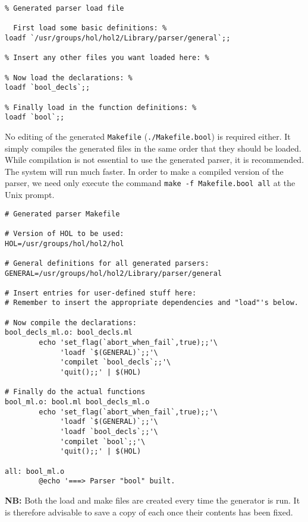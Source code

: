 \small
\begin{center}
\begin{boxed}
\begin{verbatim}
% Generated parser load file 

  First load some basic definitions: %
loadf `/usr/groups/hol/hol2/Library/parser/general`;;

% Insert any other files you want loaded here: %

% Now load the declarations: %
loadf `bool_decls`;;

% Finally load in the function definitions: %
loadf `bool`;; 
\end{verbatim}
\end{boxed}
\end{center}
\normalsize

No editing of the generated {\tt Makefile} (\verb"./Makefile.bool") is 
required either.  It simply compiles the generated files in the same order
that they should be loaded.  While compilation is not essential to use the
generated parser, it is recommended.  The system will run much faster.
In order to make a compiled version of the parser, we need only execute the 
command \verb"make -f Makefile.bool all" at the Unix prompt.
\small
\begin{center}
\begin{boxed}
\begin{verbatim}
# Generated parser Makefile

# Version of HOL to be used:
HOL=/usr/groups/hol/hol2/hol

# General definitions for all generated parsers:
GENERAL=/usr/groups/hol/hol2/Library/parser/general

# Insert entries for user-defined stuff here:
# Remember to insert the appropriate dependencies and "load"'s below.

# Now compile the declarations:
bool_decls_ml.o: bool_decls.ml
        echo 'set_flag(`abort_when_fail`,true);;'\
             'loadf `$(GENERAL)`;;'\
             'compilet `bool_decls`;;'\
             'quit();;' | $(HOL) 

# Finally do the actual functions
bool_ml.o: bool.ml bool_decls_ml.o
        echo 'set_flag(`abort_when_fail`,true);;'\
             'loadf `$(GENERAL)`;;'\
             'loadf `bool_decls`;;'\
             'compilet `bool`;;'\
             'quit();;' | $(HOL)

all: bool_ml.o
        @echo '===> Parser "bool" built.
\end{verbatim}
\end{boxed}
\end{center}
\normalsize
{\bf NB:} Both the load and make files are created every time the generator
is run. It is therefore advisable to save a copy of each once their contents
has been fixed.

